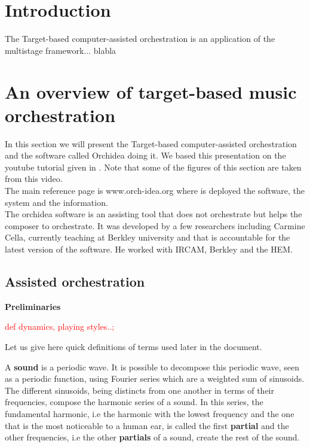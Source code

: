 \documentclass[a4paper]{book}
\newcommand{\alex}[2]{\textcolor{red}{#1}}
\begin{document}
\section{Introduction}\label{sec:introduction}
The Target-based computer-assisted orchestration is an application of the multistage framework... blabla 

\section{An overview of target-based music orchestration}\label{otargorch}

In this section we will present the Target-based computer-assisted orchestration and the software called Orchidea doing it. We based this presentation on the youtube tutorial given in \cite{youtubecella}. Note that some of the figures of this section are taken from this video.\\
The main reference page is www.orch-idea.org where is deployed the software, the system and the information.\\
The orchidea software is an assisting tool that does not orchestrate but helps the composer to orchestrate. It was developed by a few researchers including Carmine Cella, currently teaching at Berkley university and that is accountable for the latest version of the software. He worked with IRCAM, Berkley and the HEM.  \\


\subsection{Assisted orchestration}
\textbf{Preliminaries}

\alex{def dynamics, playing styles..;}\\

Let us give here quick definitions of terms used later in the document. 

A \textbf{sound} is a periodic wave. It is possible to decompose this periodic wave, seen as a periodic function, using Fourier series which are a weighted sum of sinusoids.\\

The different sinusoids, being distincts from one another in terms of their frequencies, compose the harmonic series of a sound. In this series, the fundamental harmonic, i.e the harmonic with the lowest frequency and the one that is the most noticeable to a human ear, is called the first \textbf{partial} and the other frequencies, i.e the other \textbf{partials} of a sound, create the rest of the sound.\\
\end{document}
